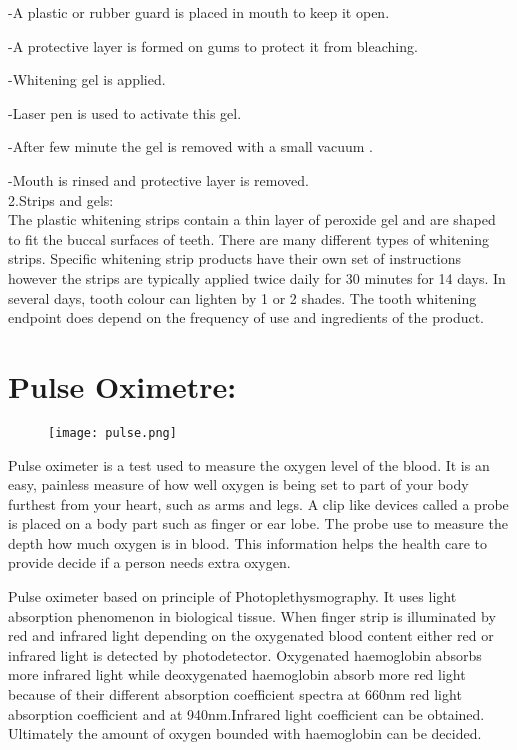 \documentclass[a4paper,12pt]{article}
\begin{document}
-A plastic or rubber guard is placed in mouth to keep it open.

-A protective layer is formed on gums to protect it from bleaching.

-Whitening gel  is applied.

-Laser pen is used to activate this gel.

-After few minute the gel is removed with a small vacuum .

-Mouth is rinsed and protective layer is removed.
\\
    
    2.Strips and gels:
    \\
    The plastic whitening strips contain a thin layer of peroxide gel and are shaped to fit the buccal surfaces of teeth. There are many different types of whitening strips. Specific whitening strip products have their own set of instructions however the strips are typically applied twice daily for 30 minutes for 14 days. In several days, tooth colour can lighten by 1 or 2 shades. The tooth whitening endpoint does depend on the frequency of use and ingredients of the product.
   \clearpage
   
   \large
    \section{Pulse Oximetre:}
    \begin{figure}[h]
    	
    	\texttt{[image: pulse.png]}
    \end{figure}

Pulse oximeter is a test used to measure the oxygen level of the blood. It is
an easy, painless measure of how well oxygen is being set to part of your body
furthest from your heart, such as arms and legs.
A clip like devices called a probe is placed on a body part such as finger
or ear lobe. The probe use to measure the depth how much oxygen is in
blood. This information helps the health care to provide decide if a person
needs extra oxygen.

Pulse oximeter based on principle of Photoplethysmography. It uses light absorption phenomenon in biological tissue. When finger strip is
illuminated by red and infrared light depending on the oxygenated blood
content either red or infrared light is detected by photodetector.
Oxygenated haemoglobin absorbs more infrared light while deoxygenated
haemoglobin absorb more red light  because of their different absorption coefficient spectra at 660nm red light absorption coefficient and at 940nm.Infrared light coefficient can be obtained. Ultimately the amount of oxygen bounded with haemoglobin can be decided.
\clearpage
\end{document}
